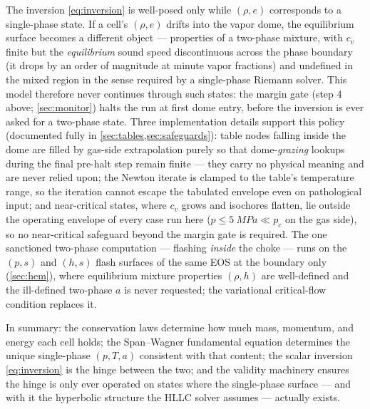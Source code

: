 \documentclass[11pt]{article}
\begin{document}
The inversion \eqref{eq:inversion} is well-posed only while
$(\rho, e)$ corresponds to a single-phase state. If a cell's
$(\rho, e)$ drifts into the vapor dome, the equilibrium surface
becomes a different object --- properties of a two-phase mixture, with
$c_v$ finite but the \emph{equilibrium} sound speed discontinuous
across the phase boundary (it drops by an order of magnitude at
minute vapor fractions) and undefined in the mixed region in the
sense required by a single-phase Riemann solver. This model therefore
never continues through such states: the margin gate (step 4 above;
\cref{sec:monitor}) halts the run at first dome entry, before the
inversion is ever asked for a two-phase state. Three implementation
details support this policy (documented fully in
\cref{sec:tables,sec:safeguards}): table nodes falling inside the
dome are filled by gas-side extrapolation purely so that
dome-\emph{grazing} lookups during the final pre-halt step remain
finite --- they carry no physical meaning and are never relied upon;
the Newton iterate is clamped to the table's temperature range, so
the iteration cannot escape the tabulated envelope even on pathological
input; and near-critical states, where $c_v$ grows and isochores
flatten, lie outside the operating envelope of every case run here
($p \le \SI{5}{MPa} \ll p_c$ on the gas side), so no near-critical
safeguard beyond the margin gate is required. The one sanctioned
two-phase computation --- flashing \emph{inside} the choke --- runs on
the $(p, s)$ and $(h, s)$ flash surfaces of the same EOS at the
boundary only (\cref{sec:hem}), where equilibrium mixture properties
$(\rho, h)$ are well-defined and the ill-defined two-phase $a$ is
never requested; the variational critical-flow condition replaces it.

In summary: the conservation laws determine how much mass, momentum,
and energy each cell holds; the Span--Wagner fundamental equation
determines the unique single-phase $(p, T, a)$ consistent with that
content; the scalar inversion \eqref{eq:inversion} is the hinge
between the two; and the validity machinery ensures the hinge is only
ever operated on states where the single-phase surface --- and with it
the hyperbolic structure the HLLC solver assumes --- actually exists.



\end{document}
